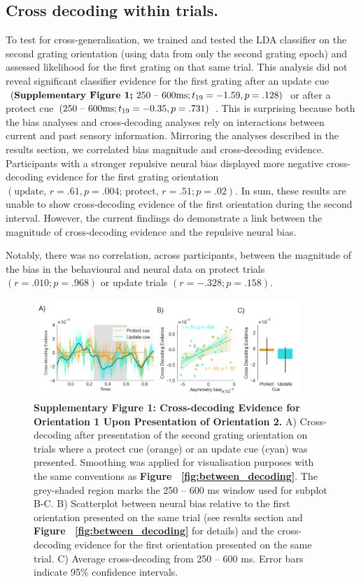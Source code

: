 \documentclass{article}
\begin{document}
\subsection*{Cross decoding within trials.}
To test for cross-generalisation, we trained and tested the LDA classifier on the second grating orientation (using data from only the second grating epoch) and assessed likelihood for the first grating on that same trial. This analysis did not reveal significant classifier evidence for the first grating after an update cue $(\text{\textbf{Supplementary Figure 1; }} 250 \text{ – } 600 \text{ms}; t\textsubscript{19} = -1.59, p = .128)$ or after a protect cue $(250 \text{ – } 600 \text{ms}; t\textsubscript{19} = -0.35, p = .731)$ . This is surprising because both the bias analyses and cross-decoding analyses rely on interactions between current and past sensory information. Mirroring the analyses described in the results section, we correlated bias magnitude and cross-decoding evidence. Participants with a stronger repulsive neural bias displayed more negative cross-decoding evidence for the first grating orientation $(\text{update, } r = .61, p = .004\text{; protect, }r = .51; p = .02)$. In sum, these results are unable to show cross-decoding evidence of the first orientation during the second interval. However, the current findings do demonstrate a link between the magnitude of cross-decoding evidence and the repulsive neural bias.  

Notably, there was no correlation, across participants, between the magnitude of the bias in the behavioural and neural data on protect trials $(r = .010; p = .968)$ or update trials $(r = -.328; p = .158)$. 

\begin{figure}
\includegraphics[width=0.9\textwidth]{figures/suppl_fig_crossdec} 
\caption*{\textbf{Supplementary Figure 1: Cross-decoding Evidence for Orientation 1 Upon Presentation of Orientation 2.} A) Cross-decoding after presentation of the second grating orientation on trials where a protect cue (orange) or an update cue (cyan) was presented. Smoothing was applied for visualisation purposes with the same conventions as \textbf{Figure ~\ref{fig:between_decoding}}. The grey-shaded region marks the 250 – 600 ms window used for subplot B-C. B) Scatterplot between neural bias relative to the first orientation presented on the same trial (see results section and \textbf{Figure ~\ref{fig:between_decoding}} for details) and the cross-decoding evidence for the first orientation presented on the same trial. C) Average cross-decoding from 250 – 600 ms. Error bars indicate 95\% confidence intervals. }
\label{fig:suppl_crossdec}
\end{figure}
\end{document}
